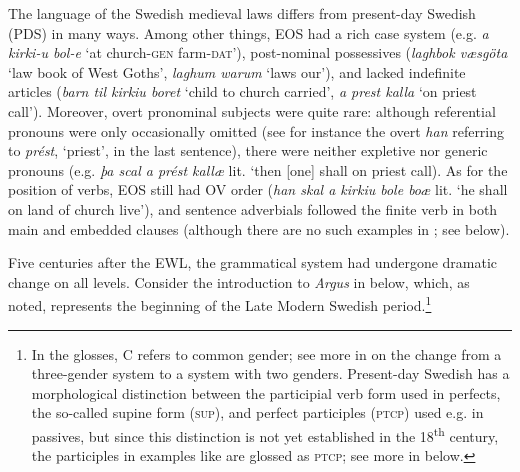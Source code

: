 \documentclass[output=paper]{langscibook}
\begin{document}
The language of the Swedish medieval laws differs from present-day Swedish (PDS) in many ways. Among other things, EOS had a rich case system (e.g. \textit{a kirki-u bol-e} ‘at church-\textsc{gen} farm-\textsc{dat’}), post-nominal possessives (\textit{laghbok væsgöta} ‘law book of West Goths’, \textit{laghum warum} ‘laws our’), and lacked indefinite articles (\textit{barn til kirkiu boret} ‘child to church carried’, \textit{a prest kalla} ‘on priest call’). Moreover, overt pronominal subjects were quite rare: although referential pronouns were only occasionally omitted (see for instance the overt \textit{han} referring to \textit{prést}, ‘priest’, in the last sentence), there were neither expletive nor generic pronouns (e.g. \textit{þa scal a prést kallæ} lit. ‘then [one] shall on priest call). As for the position of verbs, EOS still had OV order (\textit{han skal a kirkiu bole boæ} lit. ‘he shall on land of church live’), and sentence adverbials followed the finite verb in both main and embedded clauses (although there are no such examples in ; see  below).



Five centuries after the EWL, the grammatical system had undergone dramatic change on all levels. Consider the introduction to \textit{Argus} in  below, which, as noted, represents the beginning of the Late Modern Swedish period.\footnote{In the glosses, \textsc{C} refers to common gender; see more in  on the change from a three-gender system to a system with two genders. Present-day Swedish has a morphological distinction between the participial verb form used in perfects, the so-called supine form (\textsc{sup}), and perfect participles (\textsc{ptcp)} used e.g. in passives, but since this distinction is not yet established in the 18\textsuperscript{th} century, the participles in examples like  are glossed as \textsc{ptcp}; see more in  below.}
\end{document}
